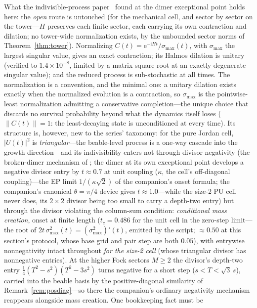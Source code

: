 \documentclass[11pt]{article}
\theoremstyle{definition}
\theoremstyle{remark}
\newcommand{\ii}{\mathrm{i}}
\newcommand{\ee}{\mathrm{e}}
\newcommand{\norm}[1]{\left\lVert #1 \right\rVert}
\begin{document}
What the indivisible-process paper~\cite{indivisible} found at the dimer exceptional point holds here: the
\emph{open} route is untouched (for the mechanical cell, and sector by
sector on the tower---$H$ preserves each finite sector, each carrying
its own contraction and dilation; no tower-wide normalization exists,
by the unbounded sector norms of Theorem~\ref{thm:tower}). Normalizing
$C(t)=\ee^{-\ii Ht}/\sigma_{\max}(t)$, with $\sigma_{\max}$ the
largest singular value, gives an exact contraction;
its Halmos dilation is unitary (verified to $1.4\times10^{-8}$,
limited by a
matrix square root at an exactly-degenerate singular value); and the
reduced process is sub-stochastic at all times. The normalization is
a convention, and the minimal one: a unitary dilation exists exactly
when the normalized evolution is a contraction, so $\sigma_{\max}$
is the pointwise-least normalization admitting a conservative
completion---the unique choice that discards no survival probability
beyond what the dynamics itself loses ($\norm{C(t)}=1$: the
least-decaying state is unconditioned at every time). Its structure is,
however, new to the series' taxonomy: for the pure Jordan cell,
$|U(t)|^{2}$ is \emph{triangular}---the beable-level process is a
one-way cascade into the growth direction---and its indivisibility
enters not through divisor negativity (the broken-dimer mechanism of
\cite{indivisible}; the dimer at its own exceptional point develops a
negative divisor entry by $t\approx0.7$ at unit coupling ($\kappa$, the
cell's off-diagonal coupling)---the EP
limit $1/(\kappa\sqrt2)$ of the companion's onset formula; the
companion's canonical $\theta=\pi/4$ device gives
$t\approx1.0$---while the size-2 PU cell never
does, its $2{\times}2$ divisor being too small to carry a depth-two entry) but through the
divisor violating the column-sum
condition: \emph{conditional mass creation}, onset at finite length
($t_c=0.486$ for the unit cell in the zero-step limit---the root
of $2t\,\sigma_{\max}^2(t)=(\sigma_{\max}^2)'(t)$, emitted by the
script;
$\approx0.50$ at this section's protocol, whose base grid and pair
step are both $0.05$), with
entrywise nonnegativity
intact throughout \emph{for the size-2 cell} (whose triangular divisor has
nonnegative entries). At the higher Fock sectors $M\ge2$ the divisor's
depth-two entry $\tfrac14(T^{2}-s^{2})(T^{2}-3s^{2})$ turns negative for a short
step ($s<T<\sqrt3\,s$), carried into the beable basis by the positive-diagonal
similarity of Remark~\ref{rem:posdiag}---so there the companion's ordinary
negativity mechanism reappears alongside mass creation. One bookkeeping fact must be
\end{document}
